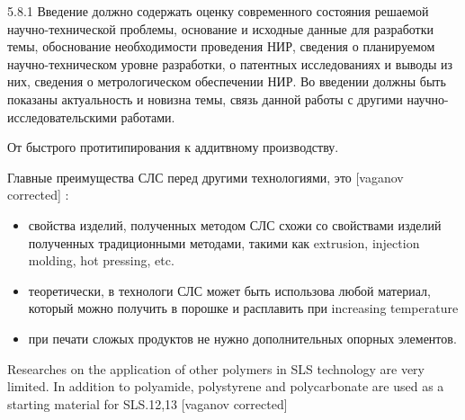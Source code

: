 
	5.8.1 Введение должно содержать оценку современного состояния решаемой научно-технической проблемы, основание и исходные данные для разработки темы, обоснование необходимости проведения НИР, сведения о планируемом научно-техническом уровне разработки, о патентных исследованиях и выводы из них, сведения о метрологическом обеспечении НИР. Во введении должны быть показаны актуальность и новизна темы, связь данной работы с другими научно-исследовательскими работами.

От быстрого протитипирования к аддитвному производству.

Главные преимущества СЛС перед другими технологиями, это 	[vaganov corrected]
:
\begin{itemize}
    \item свойства изделий, полученных методом СЛС схожи со свойствами изделий полученных традиционными методами, такими как extrusion, injection molding, hot pressing, etc.
    \item теоретически, в технологи СЛС может быть использова любой материал, который можно получить в порошке и расплавить при increasing temperature
    \item при печати сложых продуктов не нужно дополнительных опорных элементов.
\end{itemize}

	Researches on the application of other polymers in SLS technology are very limited. In addition to polyamide, polystyrene and polycarbonate are used as a starting material for SLS.12,13
	[vaganov corrected]
	
